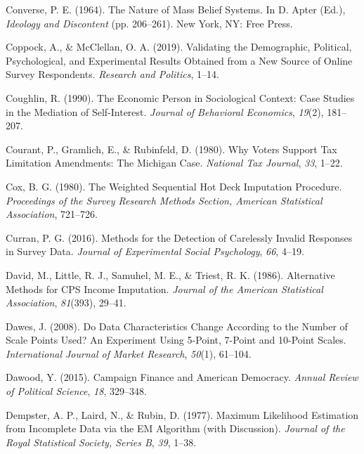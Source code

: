 \documentclass[12pt,econ]{sources/authesis}
\begin{document}
\leavevmode\hypertarget{ref-converse_nature_1964}{}%
Converse, P. E. (1964). The Nature of Mass Belief Systems. In D. Apter (Ed.), \emph{Ideology and Discontent} (pp. 206--261). New York, NY: Free Press.

\leavevmode\hypertarget{ref-coppock_2019_validating}{}%
Coppock, A., \& McClellan, O. A. (2019). Validating the Demographic, Political, Psychological, and Experimental Results Obtained from a New Source of Online Survey Respondents. \emph{Research and Politics}, 1--14.

\leavevmode\hypertarget{ref-coughlin_economic_1990}{}%
Coughlin, R. (1990). The Economic Person in Sociological Context: Case Studies in the Mediation of Self-Interest. \emph{Journal of Behavioral Economics}, \emph{19}(2), 181--207.

\leavevmode\hypertarget{ref-courant_why_1980}{}%
Courant, P., Gramlich, E., \& Rubinfeld, D. (1980). Why Voters Support Tax Limitation Amendments: The Michigan Case. \emph{National Tax Journal}, \emph{33}, 1--22.

\leavevmode\hypertarget{ref-cox_1980_weighted}{}%
Cox, B. G. (1980). The Weighted Sequential Hot Deck Imputation Procedure. \emph{Proceedings of the Survey Research Methods Section, American Statistical Association}, 721--726.

\leavevmode\hypertarget{ref-curran_2016_methods}{}%
Curran, P. G. (2016). Methods for the Detection of Carelessly Invalid Responses in Survey Data. \emph{Journal of Experimental Social Psychology}, \emph{66}, 4--19.

\leavevmode\hypertarget{ref-david_1986_alternative}{}%
David, M., Little, R. J., Samuhel, M. E., \& Triest, R. K. (1986). Alternative Methods for CPS Income Imputation. \emph{Journal of the American Statistical Association}, \emph{81}(393), 29--41.

\leavevmode\hypertarget{ref-dawes_2008_data}{}%
Dawes, J. (2008). Do Data Characteristics Change According to the Number of Scale Points Used? An Experiment Using 5-Point, 7-Point and 10-Point Scales. \emph{International Journal of Market Research}, \emph{50}(1), 61--104.

\leavevmode\hypertarget{ref-dawood_campaign_2015}{}%
Dawood, Y. (2015). Campaign Finance and American Democracy. \emph{Annual Review of Political Science}, \emph{18}, 329--348.

\leavevmode\hypertarget{ref-dempster_1977_maximum}{}%
Dempster, A. P., Laird, N., \& Rubin, D. (1977). Maximum Likelihood Estimation from Incomplete Data via the EM Algorithm (with Discussion). \emph{Journal of the Royal Statistical Society, Series B}, \emph{39}, 1--38.
\end{document}
